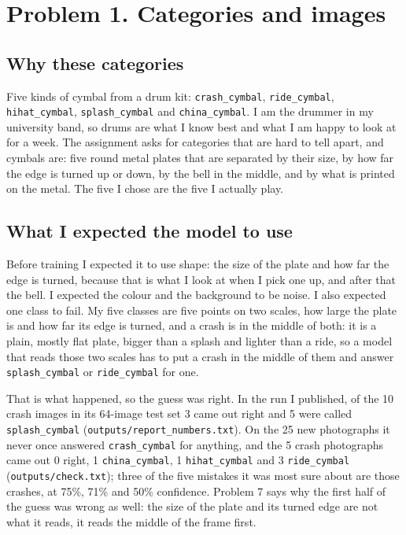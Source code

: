 \documentclass[11pt]{article}
\begin{document}
\makeheader


\section*{Problem 1. Categories and images}

\subsection*{Why these categories}

Five kinds of cymbal from a drum kit: \texttt{crash\_cymbal},
\texttt{ride\_cymbal}, \texttt{hihat\_cymbal}, \texttt{splash\_cymbal} and
\texttt{china\_cymbal}. I am the drummer in my university band, so drums are
what I know best and what I am happy to look at for a week. The assignment asks
for categories that are hard to tell apart, and cymbals are: five round metal
plates that are separated by their size, by how far the edge is turned up or
down, by the bell in the middle, and by what is printed on the metal. The five I
chose are the five I actually play.

\subsection*{What I expected the model to use}

Before training I expected it to use shape: the size of the plate and how far
the edge is turned, because that is what I look at when I pick one up, and after
that the bell. I expected the colour and the background to be noise. I also
expected one class to fail. My five classes are five points on two scales, how
large the plate is and how far its edge is turned, and a crash is in the middle
of both: it is a plain, mostly flat plate, bigger than a splash and lighter than
a ride, so a model that reads those two scales has to put a crash in the middle
of them and answer \texttt{splash\_cymbal} or \texttt{ride\_cymbal} for one.

That is what happened, so the guess was right. In the run I published, of the
10 crash images in its 64-image test set 3 came out right and 5 were called
\texttt{splash\_cymbal} (\texttt{outputs/report\_numbers.txt}). On the 25 new
photographs it never once answered \texttt{crash\_cymbal} for anything, and the
5 crash photographs came out 0 right, 1 \texttt{china\_cymbal},
1 \texttt{hihat\_cymbal} and 3 \texttt{ride\_cymbal}
(\texttt{outputs/check.txt}); three of the five mistakes it was most sure about
are those crashes, at 75\%, 71\% and 50\% confidence. Problem 7 says why the
first half of the guess was wrong as well: the size of the plate and its turned
edge are not what it reads, it reads the middle of the frame first.
\end{document}
